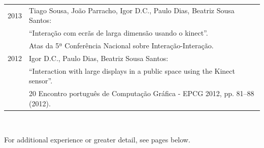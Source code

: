 \documentclass[letter,10pt]{article} %
\begin{document}
\begin{tabular}{rl}
	\textsc{2013} & Tiago Sousa, João Parracho, Igor D.C., Paulo Dias, Beatriz Sousa Santos: \\
	& ``Interação com ecrãs de larga dimensão usando o kinect''. \\
	& Atas da 5ª Conferência Nacional sobre Interação-Interação. \normalsize\\
	
	\textsc{2012} & Igor D.C., Paulo Dias, Beatriz Sousa Santos: \\
	& ``Interaction with large displays in a public space using the Kinect sensor''. \\
	& 20 Encontro português de Computação Gráfica - EPCG 2012, pp. 81–88 (2012). \normalsize\\
	
\end{tabular} \\

\newpage

\begin{center} 
	\LARGE{For additional experience or greater detail, see pages below.}
\end{center} 

\end{document}
